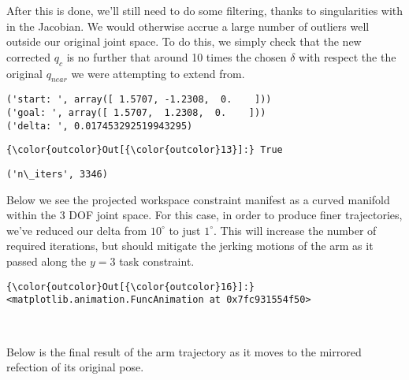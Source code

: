 \documentclass{article}
\begin{document}
After this is done, we'll still need to do some filtering, thanks to
singularities with in the Jacobian. We would otherwise accrue a large
number of outliers well outside our original joint space. To do this, we
simply check that the new corrected $q_c$ is no further that around 10
times the chosen $\delta$ with respect the the original $q_{near}$ we
were attempting to extend from.



    \begin{Verbatim}[commandchars=\\\{\}]
('start: ', array([ 1.5707, -1.2308,  0.    ]))
('goal: ', array([ 1.5707,  1.2308,  0.    ]))
('delta: ', 0.017453292519943295)
    \end{Verbatim}

            \begin{Verbatim}[commandchars=\\\{\}]
{\color{outcolor}Out[{\color{outcolor}13}]:} True
\end{Verbatim}
        

    \begin{Verbatim}[commandchars=\\\{\}]
('n\_iters', 3346)
    \end{Verbatim}

    Below we see the projected workspace constraint manifest as a curved
manifold within the 3 DOF joint space. For this case, in order to
produce finer trajectories, we've reduced our delta from $10^\circ$ to
just $1^\circ$. This will increase the number of required iterations,
but should mitigate the jerking motions of the arm as it passed along
the $y=3$ task constraint.



            \begin{Verbatim}[commandchars=\\\{\}]
{\color{outcolor}Out[{\color{outcolor}16}]:} <matplotlib.animation.FuncAnimation at 0x7fc931554f50>
\end{Verbatim}
        
    \begin{center}
    \end{center}
    { \hspace*{\fill} \\}
    
    Below is the final result of the arm trajectory as it moves to the
mirrored refection of its original pose.
\end{document}
